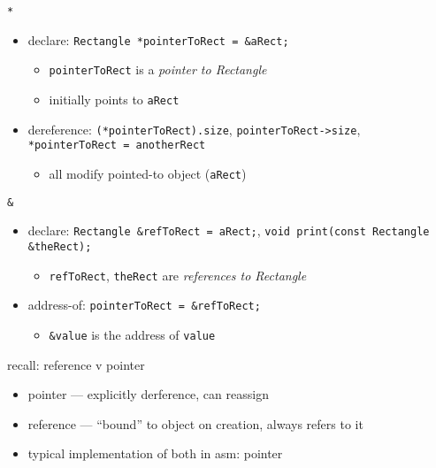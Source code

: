\begin{frame}[fragile,label=star]{\texttt{*}}
\lstset{
    language=C++,
    style=small,
    morekeywords=Rectangle
}
\begin{itemize}
\item declare: \lstinline|Rectangle *pointerToRect = &aRect;|
    \begin{itemize}
    \item \texttt{pointerToRect} is a \textit{pointer to Rectangle}
    \item initially points to \lstinline|aRect|
    \end{itemize}
\item dereference: \lstinline|(*pointerToRect).size|, \lstinline|pointerToRect->size|, \lstinline|*pointerToRect = anotherRect|
    \begin{itemize}
    \item all modify pointed-to object (\lstinline|aRect|)
    \end{itemize}
\end{itemize}
\end{frame}

\begin{frame}[fragile,label=amp]{\texttt{\&}}
\begin{itemize}
\item declare: \lstinline|Rectangle &refToRect = aRect;|, \lstinline|void print(const Rectangle &theRect);|
    \begin{itemize}
    \item \texttt{refToRect}, \texttt{theRect} are \textit{references to Rectangle}
    \end{itemize}
\item address-of: \lstinline|pointerToRect = &refToRect;|
    \begin{itemize}
    \item \lstinline|&value| is the address of \lstinline|value|
    \end{itemize}
\end{itemize}
\end{frame}

\begin{frame}{recall: reference v pointer}
\begin{itemize}
\item pointer --- explicitly derference, can reassign
\item reference --- ``bound'' to object on creation, always refers to it
\vspace{.5cm}
\item typical implementation of both in asm: pointer
\end{itemize}
\end{frame}
